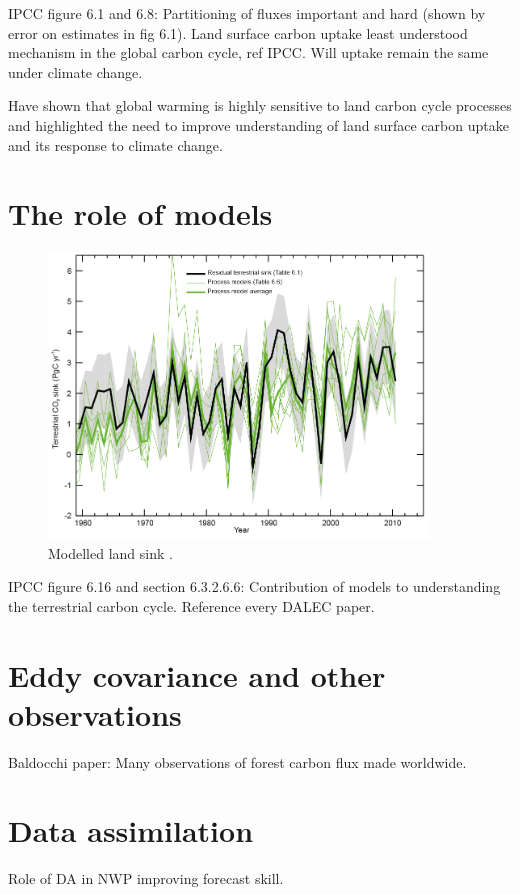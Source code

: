 \documentclass[11pt]{article}
\begin{document}
IPCC figure 6.1 and 6.8: Partitioning of fluxes important and hard (shown by error on estimates in fig 6.1). Land surface carbon uptake least understood mechanism in the global carbon cycle, ref IPCC. Will uptake remain the same under climate change.

\citet{1748-9326-7-2-024002} Have shown that global warming is highly sensitive to land carbon cycle processes and highlighted the need to improve understanding of land surface carbon uptake and its response to climate change. 

\section{The role of models}

\begin{figure}[ht]
    \centering
    \includegraphics[width=0.9\textwidth]{ipcc_fig6_16.jpg}
    \caption{Modelled land sink \citep{ciais2014carbon}.}
    \label{fig:ipcc_fig6.1}
\end{figure}

IPCC figure 6.16 and section 6.3.2.6.6: Contribution of models to understanding the terrestrial carbon cycle. Reference every DALEC paper.

\section{Eddy covariance and other observations}

Baldocchi paper: Many observations of forest carbon flux made worldwide.

\section{Data assimilation}

Role of DA in NWP improving forecast skill. 


{}
\end{document}
